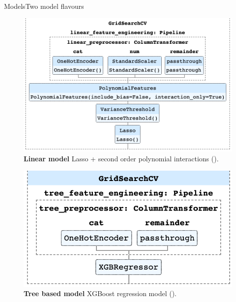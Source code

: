 \documentclass[10pt]{beamer}
\begin{document}
\begin{frame}{Models}{Two model flavours}
\begin{center}
  \begin{figure}
    \includegraphics[scale=0.3]{images/linear_grid_search.png}
    \caption{{\bf Linear model} Lasso + second order polynomial interactions (\cite{scikit-learn}).}
  \end{figure}
\end{center}
\begin{center}
  \begin{figure}
    \includegraphics[scale=0.4]{images/tree_grid_search.png}
    \caption{{\bf Tree based model} XGBoost regression model (\cite{xgboost}).}
  \end{figure}
\end{center}
\end{frame}
\end{document}

